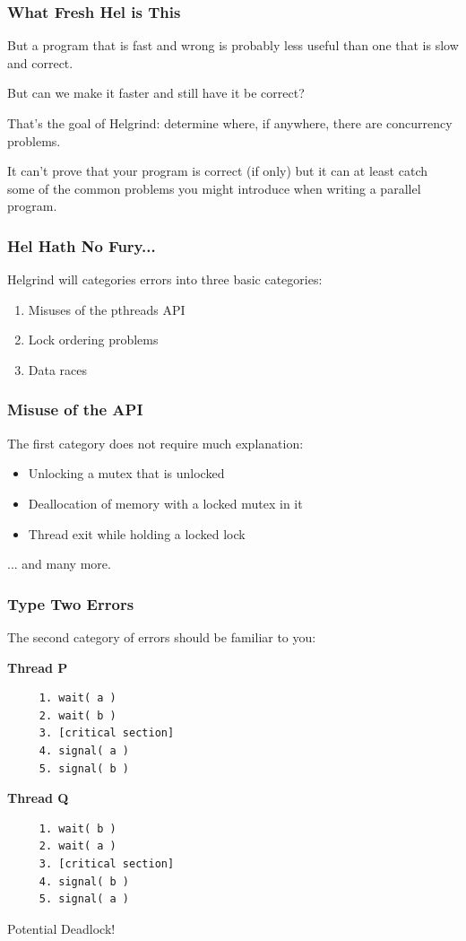 \begin{frame}
	\frametitle{What Fresh Hel is This}

	But a program that is fast and wrong is probably less useful than one that is slow and correct.

	But can we make it faster and still have it be correct?

	That's the goal of Helgrind: determine where, if anywhere, there are concurrency problems.

	It can't prove that your program is correct (if only) but it can at least catch some of the common problems you might introduce when writing a parallel program.

\end{frame}

\begin{frame}
	\frametitle{Hel Hath No Fury...}

	Helgrind will categories errors into three basic categories:

	\begin{enumerate}
		\item Misuses of the pthreads API
		\item Lock ordering problems
		\item Data races
	\end{enumerate}


\end{frame}

\begin{frame}
	\frametitle{Misuse of the API}

	The first category does not require much explanation:


	\begin{itemize}
		\item Unlocking a mutex that is unlocked
		\item Deallocation of memory with a locked mutex in it
		\item Thread exit while holding a locked lock
	\end{itemize}
	... and many more.


\end{frame}

\begin{frame}[fragile]
	\frametitle{Type Two Errors}

	The second category of errors should be familiar to you:

	\begin{multicols}{2}
		\textbf{Thread P}
		\begin{verbatim}
	 1. wait( a ) 
	 2. wait( b )
	 3. [critical section]
	 4. signal( a )
	 5. signal( b )
  \end{verbatim}
		\columnbreak
		\textbf{Thread Q}
		\begin{verbatim}
	 1. wait( b ) 
	 2. wait( a )
	 3. [critical section]
	 4. signal( b )
	 5. signal( a )
  \end{verbatim}
	\end{multicols}
	\vspace{-2em}

	Potential Deadlock!

\end{frame}

